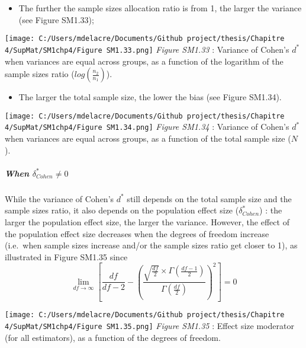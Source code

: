 \documentclass[
  english,
  man,mask,floatsintext]{apa6}
\providecommand{\tightlist}{%
  \setlength{\itemsep}{0pt}\setlength{\parskip}{0pt}}
\let\oldsubparagraph\subparagraph
\renewcommand{\subparagraph}[1]{\oldsubparagraph{#1}\mbox{}}
\begin{document}
\newpage

\begin{itemize}
\tightlist
\item
  The further the sample sizes allocation ratio is from 1, the larger the variance (see Figure SM1.33);
\end{itemize}

\texttt{[image: C:/Users/mdelacre/Documents/Github project/thesis/Chapitre 4/SupMat/SM1chp4/Figure SM1.33.png]}
\emph{Figure SM1.33} : Variance of Cohen's \(d^*\) when variances are equal across groups, as a function of the logarithm of the sample sizes ratio (\(log\left(\frac{n_2}{n_1} \right)\)).

\newpage

\begin{itemize}
\tightlist
\item
  The larger the total sample size, the lower the bias (see Figure SM1.34).
\end{itemize}

\texttt{[image: C:/Users/mdelacre/Documents/Github project/thesis/Chapitre 4/SupMat/SM1chp4/Figure SM1.34.png]}
\emph{Figure SM1.34} : Variance of Cohen's \(d^*\) when variances are equal across groups, as a function of the total sample size (\(N\)).

\newpage

\hypertarget{when-delta_cohen-neq-0}{%
\subparagraph{\texorpdfstring{When \(\delta^*_{Cohen} \neq 0\)}{When \textbackslash delta\^{}*\_\{Cohen\} \textbackslash neq 0}}\label{when-delta_cohen-neq-0}}

While the variance of Cohen's \(d^*\) still depends on the total sample size and the sample sizes ratio, it also depends on the population effect size (\(\delta^*_{Cohen}\)) : the larger the population effect size, the larger the variance. However, the effect of the population effect size decreases when the degrees of freedom increase (i.e.~when sample sizes increase and/or the sample sizes ratio get closer to 1), as illustrated in Figure SM1.35 since
\[\lim_{df\rightarrow \infty}\left[\frac{df}{df-2} - \left( \frac{\sqrt{\frac{df}{2}} \times \Gamma \left(\frac{df-1}{2} \right)}{\Gamma \left( \frac{df}{2}\right)}\right)^2 \right]=0\]

\texttt{[image: C:/Users/mdelacre/Documents/Github project/thesis/Chapitre 4/SupMat/SM1chp4/Figure SM1.35.png]}
\emph{Figure SM1.35} : Effect size moderator (for all estimators), as a function of the degrees of freedom.

\newpage
\end{document}

